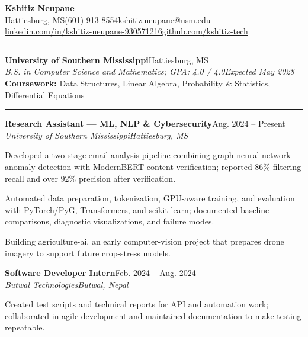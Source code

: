\documentclass[10pt,letterpaper]{article}
\newcommand{\ressection}[1]{\par\vspace{8pt}{\large\scshape #1}\par\vspace{2pt}\hrule\vspace{5pt}}
\newenvironment{bullets}{\begin{list}{\textendash}{\setlength{\leftmargin}{1.3em}\setlength{\labelsep}{0.4em}\setlength{\topsep}{3pt}\setlength{\itemsep}{2pt}\setlength{\parsep}{0pt}\setlength{\partopsep}{0pt}}}{\end{list}}
\begin{document}
\begin{center}
  {\LARGE\bfseries Kshitiz Neupane}\\[4pt]
  {\small Hattiesburg, MS\enspace\textbar\enspace (601) 913-8554\enspace\textbar\enspace\href{mailto:kshitiz.neupane@usm.edu}{kshitiz.neupane@usm.edu}}\\[2pt]
  {\small\href{https://www.linkedin.com/in/kshitiz-neupane-930571216}{linkedin.com/in/kshitiz-neupane-930571216}\enspace\textbar\enspace\href{https://github.com/kshitiz-tech}{github.com/kshitiz-tech}}
\end{center}
\vspace{-6pt}
\ressection{Education}
\textbf{University of Southern Mississippi}\hfill Hattiesburg, MS\\
\textit{B.S. in Computer Science and Mathematics; GPA: 4.0 / 4.0}\hfill\textit{Expected May 2028}\\[2pt]
{\small\textbf{Coursework:} Data Structures, Linear Algebra, Probability \& Statistics, Differential Equations}
\ressection{Experience}
\textbf{Research Assistant --- ML, NLP \& Cybersecurity}\hfill Aug. 2024 -- Present\\
\textit{University of Southern Mississippi}\hfill\textit{Hattiesburg, MS}
\begin{bullets}
\item Developed a two-stage email-analysis pipeline combining graph-neural-network anomaly detection with ModernBERT content verification; reported 86\% filtering recall and over 92\% precision after verification.
\item Automated data preparation, tokenization, GPU-aware training, and evaluation with PyTorch/PyG, Transformers, and scikit-learn; documented baseline comparisons, diagnostic visualizations, and failure modes.
\item Building agriculture-ai, an early computer-vision project that prepares drone imagery to support future crop-stress models.
\end{bullets}

\vspace{3pt}
\textbf{Software Developer Intern}\hfill Feb. 2024 -- Aug. 2024\\
\textit{Butwal Technologies}\hfill\textit{Butwal, Nepal}
\begin{bullets}
\item Created test scripts and technical reports for API and automation work; collaborated in agile development and maintained documentation to make testing repeatable.
\end{bullets}
\end{document}
